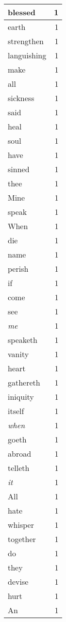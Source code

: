 \begin{center}
\begin{longtable}{l|r}
blessed & 1 \\ \hline
earth & 1 \\ \hline
strengthen & 1 \\ \hline
languishing & 1 \\ \hline
make & 1 \\ \hline
all & 1 \\ \hline
sickness & 1 \\ \hline
said & 1 \\ \hline
heal & 1 \\ \hline
soul & 1 \\ \hline
have & 1 \\ \hline
sinned & 1 \\ \hline
thee & 1 \\ \hline
Mine & 1 \\ \hline
speak & 1 \\ \hline
When & 1 \\ \hline
die & 1 \\ \hline
name & 1 \\ \hline
perish & 1 \\ \hline
if & 1 \\ \hline
come & 1 \\ \hline
see & 1 \\ \hline
\emph{me} & 1 \\ \hline
speaketh & 1 \\ \hline
vanity & 1 \\ \hline
heart & 1 \\ \hline
gathereth & 1 \\ \hline
iniquity & 1 \\ \hline
itself & 1 \\ \hline
\emph{when} & 1 \\ \hline
goeth & 1 \\ \hline
abroad & 1 \\ \hline
telleth & 1 \\ \hline
\emph{it} & 1 \\ \hline
All & 1 \\ \hline
hate & 1 \\ \hline
whisper & 1 \\ \hline
together & 1 \\ \hline
do & 1 \\ \hline
they & 1 \\ \hline
devise & 1 \\ \hline
hurt & 1 \\ \hline
An & 1 \\ \hline

\end{longtable}
\end{center}
